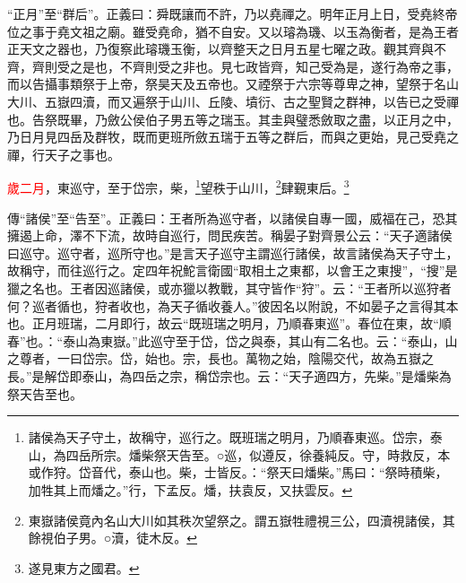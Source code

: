{\noindent\shu{}\fzkt “正月”至“群后”。正義曰：舜既讓而不許，乃以堯禪之。明年正月上日，受堯終帝位之事于堯文祖之廟。雖受堯命，猶不自安。又以璿為璣、以玉為衡者，是為王者正天文之器也，乃復察此璿璣玉衡，以齊整天之日月五星七曜之政。觀其齊與不齊，齊則受之是也，不齊則受之非也。見七政皆齊，知己受為是，遂行為帝之事，而以告攝事類祭于上帝，祭昊天及五帝也。又禋祭于六宗等尊卑之神，望祭于名山大川、五嶽四瀆，而又遍祭于山川、丘陵、墳衍、古之聖賢之群神，以告已之受禪也。告祭既畢，乃斂公侯伯子男五等之瑞玉。其圭與璧悉斂取之盡，以正月之中，乃日月見四岳及群牧，既而更班所斂五瑞于五等之群后，而與之更始，見己受堯之禪，行天子之事也。 \par}

\textcolor{red}{歲二月}，東巡守，至于岱宗，柴，\footnote{諸侯為天子守土，故稱守，巡行之。既班瑞之明月，乃順春東巡。岱宗，泰山，為四岳所宗。燔柴祭天告至。○巡，似遵反，徐養純反。守，時救反，本或作狩。岱音代，泰山也。柴，士皆反。：“祭天曰燔柴。”馬曰：“祭時積柴，加牲其上而燔之。”行，下孟反。燔，扶袁反，又扶雲反。}望秩于山川，\footnote{東嶽諸侯竟內名山大川如其秩次望祭之。謂五嶽牲禮視三公，四瀆視諸侯，其餘視伯子男。○瀆，徒木反。}肆覲東后。\footnote{遂見東方之國君。}

{\noindent\zhuan{}\fzbyks 傳“諸侯”至“告至”。正義曰：王者所為巡守者，以諸侯自專一國，威福在己，恐其擁遏上命，澤不下流，故時自巡行，問民疾苦。稱晏子對齊景公云：“天子適諸侯曰巡守。巡守者，巡所守也。”是言天子巡守主謂巡行諸侯，故言諸侯為天子守土，故稱守，而往巡行之。定四年祝鮀言衛國“取相土之東都，以會王之東搜”，“搜”是獵之名也。王者因巡諸侯，或亦獵以教戰，其守皆作“狩”。云：“王者所以巡狩者何？巡者循也，狩者收也，為天子循收養人。”彼因名以附說，不如晏子之言得其本也。正月班瑞，二月即行，故云“既班瑞之明月，乃順春東巡”。春位在東，故“順春”也。：“泰山為東嶽。”此巡守至于岱，岱之與泰，其山有二名也。云：“泰山，山之尊者，一曰岱宗。岱，始也。宗，長也。萬物之始，陰陽交代，故為五嶽之長。”是解岱即泰山，為四岳之宗，稱岱宗也。云：“天子適四方，先柴。”是燔柴為祭天告至也。 \par}

